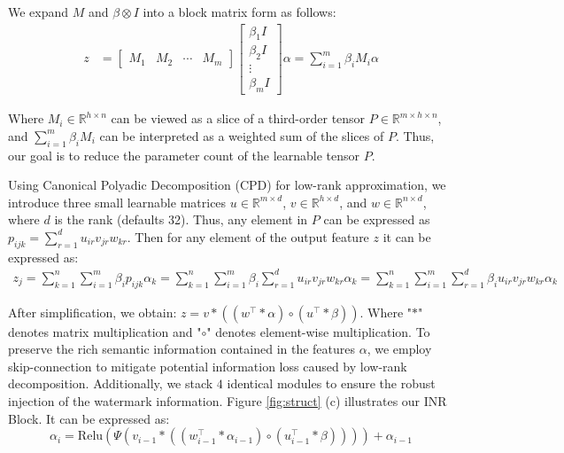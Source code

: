 \documentclass{article}
\begin{document}
We expand \( M \) and \( \beta \otimes I \) into a block matrix form as follows:
\begin{equation}
\begin{aligned}
    z&=\begin{bmatrix}
  M_1&  M_2&  \cdots & M_m
\end{bmatrix} \begin{bmatrix}
  \beta_1 I \\
  \beta_2 I\\
\vdots \\
  \beta_m I
\end{bmatrix}\alpha =\sum_{i=1}^m\beta_iM_i\alpha
\end{aligned}
\end{equation}

Where \( M_i \in \mathbb{R}^{h \times n} \) can be viewed as a slice of a third-order tensor \( P \in \mathbb{R}^{m \times h \times n} \), and \( \sum_{i=1}^m\beta_iM_i \) can be interpreted as a weighted sum of the slices of \( P \). Thus, our goal is to reduce the parameter count of the learnable tensor \( P \).

Using Canonical Polyadic Decomposition (CPD) for low-rank approximation, we introduce three small learnable matrices \( u \in \mathbb{R}^{m \times d} \), \( v \in \mathbb{R}^{h \times d} \), and \( w \in \mathbb{R}^{n \times d} \), where \( d \) is the rank (defaults 32). Thus, any element in \( P \) can be expressed as $p_{ijk}=\sum_{r=1}^{d}u_{ir}v_{jr}w_{kr}$.
Then for any element of the output feature $z$ it can be expressed as:
\begin{equation}
    \begin{aligned}
        z_j=\sum_{k=1}^{n}\sum_{i=1}^{m}\beta_ip_{ijk}\alpha_k = \sum_{k=1}^{n}\sum_{i=1}^{m}\beta_i\sum_{r=1}^{d}u_{ir}v_{jr}w_{kr}\alpha_k  =  \sum_{k=1}^{n}\sum_{i=1}^{m}\sum_{r=1}^{d}\beta_iu_{ir}v_{jr}w_{kr}\alpha_k
    \end{aligned}
\end{equation}

After simplification, we obtain: $z=v*((w^\top*\alpha)\circ(u^\top*\beta))$. Where "$*$" denotes matrix multiplication and "$\circ$" denotes element-wise multiplication. To preserve the rich semantic information contained in the features \( \alpha \), we employ skip-connection to mitigate potential information loss caused by low-rank decomposition. Additionally, we stack $4$ identical modules to ensure the robust injection of the watermark information. Figure \ref{fig:struct} (c) illustrates our INR Block. It can be expressed as:
\begin{equation}
    \alpha_{i}=\mathrm{Relu}(\Psi(v_{i-1}*((w^\top_{i-1}*\alpha_{i-1})\circ(u^\top_{i-1}*\beta))))+\alpha_{i-1}
\end{equation}
\end{document}
